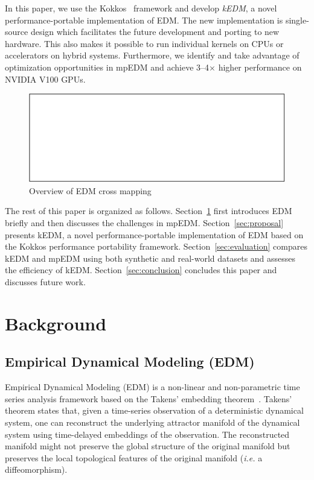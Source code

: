 \documentclass[conference]{IEEEtran}
\begin{document}
In this paper, we use the Kokkos~\cite{Edwards2014} framework and develop
\textit{kEDM}, a novel performance-portable implementation of EDM\@.
The new implementation is single-source design which facilitates the future
development and porting to new hardware. This also makes it possible to run
individual kernels on CPUs or accelerators on hybrid systems. Furthermore, we
identify and take advantage of optimization opportunities in mpEDM and achieve
3--4$\times$ higher performance on NVIDIA V100 GPUs.

\begin{figure}
    \centering
    \includegraphics{figs/xmap_overview}
    \caption{Overview of EDM cross mapping}%
    \label{fig:edm}
\end{figure}

The rest of this paper is organized as follows. Section~\ref{sec:background}
first introduces EDM briefly and then discusses the challenges in mpEDM\@.
Section~\ref{sec:proposal} presents kEDM, a novel performance-portable
implementation of EDM based on the Kokkos performance portability framework.
Section~\ref{sec:evaluation} compares kEDM and mpEDM using both synthetic and
real-world datasets and assesses the efficiency of kEDM\@.
Section~\ref{sec:conclusion} concludes this paper and discusses future work.

\section{Background}\label{sec:background}

\subsection{Empirical Dynamical Modeling (EDM)}\label{sec:edm}

Empirical Dynamical Modeling (EDM) is a non-linear and non-parametric time
series analysis framework based on the Takens' embedding
theorem~\cite{Deyle2011}. Takens' theorem states that, given a time-series
observation of a deterministic dynamical system, one can reconstruct the
underlying attractor manifold of the dynamical system using time-delayed
embeddings of the observation. The reconstructed manifold might not preserve
the global structure of the original manifold but preserves the local
topological features of the original manifold (\textit{i.e.} a diffeomorphism).
\end{document}

